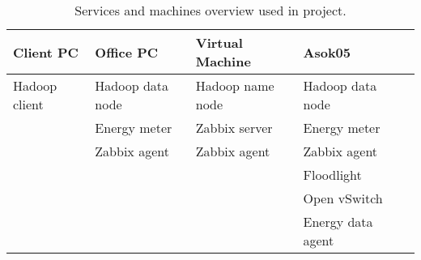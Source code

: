 \begin{table}[b]
	\centering
	\caption{Services and machines overview used in project. }
	\begin{tabular}{|l|l|l|l|l|}
		\hline \rule[-2ex]{0pt}{5.5ex} \textbf{Client PC} & \textbf{Office PC} & \textbf{Virtual Machine} & \textbf{Asok05} \\ 
		\hline \rule[-2ex]{0pt}{5.5ex} Hadoop client & Hadoop data node & Hadoop name node & Hadoop data node \\ 
		       \rule[-2ex]{0pt}{5.5ex}  & Energy meter & Zabbix server & Energy meter \\ 
		       \rule[-2ex]{0pt}{5.5ex}  & Zabbix agent & Zabbix agent & Zabbix agent \\ 
		       \rule[-2ex]{0pt}{5.5ex}  &  &  & Floodlight \\ 
		       \rule[-2ex]{0pt}{5.5ex}  &  &  & Open vSwitch \\ 
		       \rule[-2ex]{0pt}{5.5ex}  &  &  & Energy data agent \\ 
		\hline 
	\end{tabular}
	\label{tab:services}
\end{table}
